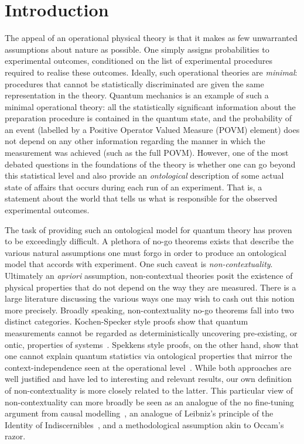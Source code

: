 \documentclass[a4paper,onecolumn,11pt,accepted=2018-05-04]{quantumarticle}
\begin{document}
\section*{Introduction} The appeal of an operational physical theory is that it makes as few unwarranted assumptions about nature as possible. One simply assigns probabilities to experimental outcomes, conditioned on the list of experimental procedures required to realise these outcomes. Ideally, such operational theories are \emph{minimal}: procedures that cannot be statistically discriminated are given the same representation in the theory. Quantum mechanics is an example of such a minimal operational theory: all the statistically significant information about the preparation procedure is contained in the quantum state, and the probability of an event (labelled by a Positive Operator Valued Measure (POVM) element) does not depend on any other information regarding the manner in which the measurement was achieved (such as the full POVM). However, one of the most debated questions in the foundations of the theory is whether one can go beyond this statistical level and also provide an \emph{ontological} description of some actual state of affairs that occurs during each run of an experiment. That is, a statement about the world that tells us what is responsible for the observed experimental outcomes. 

The task of providing such an ontological model for quantum theory has proven to be exceedingly difficult. A plethora of no-go theorems exists that describe the various natural assumptions one must forgo in order to produce an ontological model that accords with experiment. One such caveat is \emph{non-contextuality}. Ultimately an \emph{apriori} assumption, non-contextual theories posit the existence of physical properties that do not depend on the way they are measured. There is a large literature discussing the various ways one may wish to cash out this notion more precisely. Broadly speaking, non-contextuality no-go theorems fall into two distinct categories. Kochen-Specker style proofs show that quantum measurements cannot be regarded as deterministically uncovering pre-existing, or ontic, properties of systems~\cite{kochen67, bell66, cabello08}. Spekkens style proofs, on the other hand,  show that one cannot explain quantum statistics via ontological properties that  mirror the context-independence seen at the operational level~\cite{spekkens05, Montina2011, kunjwal2016, Mazurek2016, Schmid2017}. While both approaches are well justified and have led to interesting and relevant results, our own definition of non-contextuality is more closely related to the latter. This particular view of non-contextuality can more broadly be seen as an analogue of the no fine-tuning argument from causal modelling~\cite{cavalcanti2017}, an analogue of Leibniz's principle of the Identity of Indiscernibles~\cite{spekkens05, kunjwal2016}, and a methodological assumption akin to Occam's razor.
\end{document}
